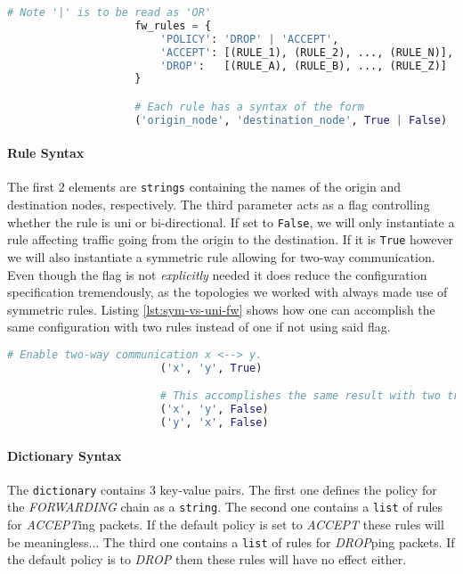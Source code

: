                 \begin{lstlisting}[language = python, caption = Syntax for Specifying Firewall Rules., label = lst:fw-dict-syntax]
                    # Note '|' is to be read as 'OR'
                    fw_rules = {
                        'POLICY': 'DROP' | 'ACCEPT',
                        'ACCEPT': [(RULE_1), (RULE_2), ..., (RULE_N)],
                        'DROP':   [(RULE_A), (RULE_B), ..., (RULE_Z)]
                    }

                    # Each rule has a syntax of the form
                    ('origin_node', 'destination_node', True | False)
                \end{lstlisting}

                \paragraph{Rule Syntax}
                    The first $2$ elements are \texttt{strings} containing the names of the origin and destination nodes, respectively. The third parameter acts as a flag controlling whether the rule is uni or bi-directional. If set to \texttt{False}, we will only instantiate a rule affecting traffic going from the origin to the destination. If it is \texttt{True} however we will also instantiate a symmetric rule allowing for two-way communication. Even though the flag is not \textit{explicitly} needed it does reduce the configuration specification tremendously, as the topologies we worked with always made use of symmetric rules. Listing \ref{lst:sym-vs-uni-fw} shows how one can accomplish the same configuration with two rules instead of one if not using said flag.\\

                    \begin{lstlisting}[language = python, caption = Uni-directional vs. Symmetric Firewall Rules., label = lst:sym-vs-uni-fw]
                        # Enable two-way communication x <--> y.
                        ('x', 'y', True)

                        # This accomplishes the same result with two triplets.
                        ('x', 'y', False)
                        ('y', 'x', False)
                    \end{lstlisting}

                \paragraph{Dictionary Syntax}
                    The \texttt{dictionary} contains $3$ key-value pairs. The first one defines the policy for the \textit{FORWARDING} chain as a \texttt{string}. The second one contains a \texttt{list} of rules for \textit{ACCEPT}ing packets. If the default policy is set to \textit{ACCEPT} these rules will be meaningless... The third one contains a \texttt{list} of rules for \textit{DROP}ping packets. If the default policy is to \textit{DROP} them these rules will have no effect either.\\

